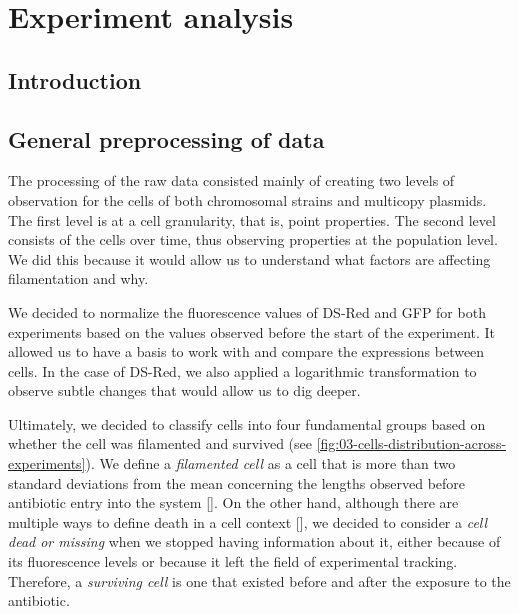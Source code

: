 \documentclass[a4paper, nobind]{templates/ociamthesis}
\begin{document}
\adjustmtc
{}

\hypertarget{experiment-analysis}{%
\chapter{Experiment analysis}\label{experiment-analysis}}

\minitoc 

\hypertarget{introduction-1}{%
\section{Introduction}\label{introduction-1}}

\hypertarget{general-preprocessing-of-data}{%
\section{General preprocessing of data}\label{general-preprocessing-of-data}}

The processing of the raw data consisted mainly of creating two levels of observation for the cells of both chromosomal strains and multicopy plasmids.
The first level is at a cell granularity, that is, point properties.
The second level consists of the cells over time, thus observing properties at the population level.
We did this because it would allow us to understand what factors are affecting filamentation and why.

We decided to normalize the fluorescence values of DS-Red and GFP for both experiments based on the values observed before the start of the experiment.
It allowed us to have a basis to work with and compare the expressions between cells.
In the case of DS-Red, we also applied a logarithmic transformation to observe subtle changes that would allow us to dig deeper.

Ultimately, we decided to classify cells into four fundamental groups based on whether the cell was filamented and survived (see \ref{fig:03-cells-distribution-across-experiments}).
We define a \emph{filamented cell} as a cell that is more than two standard deviations from the mean concerning the lengths observed before antibiotic entry into the system {[}{]}.
On the other hand, although there are multiple ways to define death in a cell context {[}{]}, we decided to consider a \emph{cell dead or missing} when we stopped having information about it, either because of its fluorescence levels or because it left the field of experimental tracking.
Therefore, a \emph{surviving cell} is one that existed before and after the exposure to the antibiotic.
\end{document}
